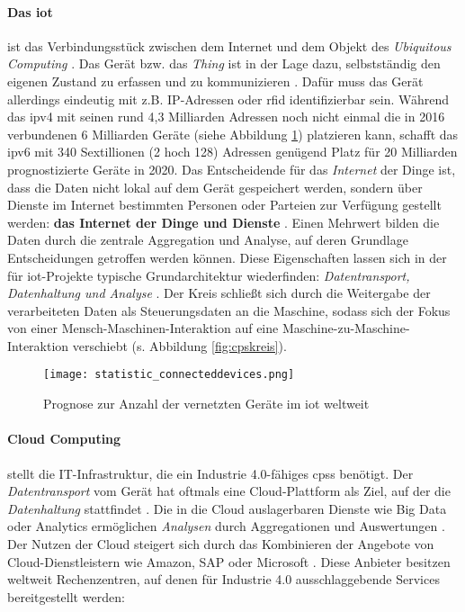 \paragraph{Das \acf{iot}} ist das Verbindungsstück zwischen dem Internet und dem Objekt des \textit{Ubiquitous Computing} \citep{Roth2016}. Das Gerät bzw. das \textit{Thing} ist in der Lage dazu, selbstständig den eigenen Zustand zu erfassen und zu kommunizieren \citep{Kenn2016}. Dafür muss das Gerät allerdings eindeutig mit z.B. IP-Adressen oder \ac{rfid} identifizierbar sein. Während das \acf{ipv4} mit seinen rund 4,3 Milliarden Adressen noch nicht einmal die in 2016 verbundenen 6 Milliarden Geräte (siehe Abbildung \ref{fig:connecteddevices}) platzieren kann, schafft das \ac{ipv6} mit 340 Sextillionen (2 hoch 128) Adressen genügend Platz für 20 Milliarden prognostizierte Geräte in 2020. Das Entscheidende für das \textit{Internet} der Dinge ist, dass die Daten nicht lokal auf dem Gerät gespeichert werden, sondern über Dienste im Internet bestimmten Personen oder Parteien zur Verfügung gestellt werden: \textbf{das Internet der Dinge und Dienste} \citep{Hanisch2017}. Einen Mehrwert bilden die Daten durch die zentrale Aggregation und Analyse, auf deren Grundlage Entscheidungen getroffen werden können. Diese Eigenschaften lassen sich in der für \ac{iot}-Projekte typische Grundarchitektur wiederfinden: \textit{Datentransport, Datenhaltung und Analyse} \citep{Kenn2016}. Der Kreis schließt sich durch die Weitergabe der verarbeiteten Daten als Steuerungsdaten an die Maschine, sodass sich der Fokus von einer Mensch-Maschinen-Interaktion auf eine Maschine-zu-Maschine-Interaktion verschiebt  (s. Abbildung \ref{fig:cpskreis}).

\begin{figure}[ht]
  \centering
  \texttt{[image: statistic\_connecteddevices.png]}
  \caption[Prognose zur Anzahl der vernetzten Geräte im Internet of TThings weltweit]{Prognose zur Anzahl der vernetzten Geräte im \ac{iot} weltweit \citep{Gartner2017a}}\label{fig:connecteddevices}
\end{figure}

\paragraph{Cloud Computing} stellt die IT-Infrastruktur, die ein Industrie 4.0-fähiges \ac{cpss} benötigt. Der \textit{Datentransport} vom Gerät hat oftmals eine Cloud-Plattform als Ziel, auf der die \textit{Datenhaltung} stattfindet \citep{Elsner2018}. Die in die Cloud auslagerbaren Dienste wie Big Data oder Analytics ermöglichen \textit{Analysen} durch Aggregationen und Auswertungen \citep{Roth2016}. Der Nutzen der Cloud steigert sich durch das Kombinieren der Angebote von Cloud-Dienstleistern wie Amazon, SAP oder Microsoft \citep{Hnisch2017}. Diese Anbieter besitzen weltweit Rechenzentren, auf denen für Industrie 4.0 ausschlaggebende Services bereitgestellt werden:

